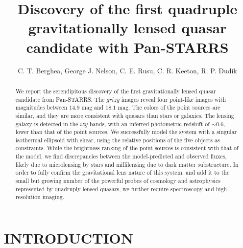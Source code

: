 \documentclass[manuscript]{aastex}
\begin{document}
\title{ Discovery of the first quadruple gravitationally lensed quasar candidate with Pan-STARRS }

\author{C. T. Berghea, George J. Nelson, C. E. Rusu, C. R. Keeton, R. P. Dudik}



\begin{abstract}

We report the serendipitous discovery of the first gravitationally lensed quasar candidate from Pan-STARRS. The $grizy$ images reveal four point-like images with magnitudes between $14.9$ mag and $18.1$ mag. The colors of the point sources are similar, and they are more consistent with quasars than stars or galaxies. The lensing galaxy is detected in the $izy$ bands, with an inferred photometric redshift of $\sim 0.6$, lower than that of the point sources. We successfully model the system with a singular isothermal ellipsoid with shear, using the relative positions of the five objects as constraints. While the brightness ranking of the point sources is consistent with that of the model, we find discrepancies between the model-predicted and observed fluxes, likely due to microlensing by stars and millilensing due to dark matter substructure. In order to fully confirm the gravitational lens nature of this system, and add it to the small but growing number of the powerful probes of cosmology and astrophysics represented by quadruply lensed quasars, we further require spectroscopy and high-resolution imaging.

\end{abstract}


\section{INTRODUCTION}
\end{document}
